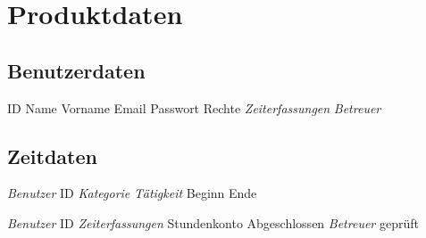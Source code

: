 \section{Produktdaten}

\subsection{Benutzerdaten}
\begin{requirements}
	\begin{requirements}
		 ID
		 Name
		 Vorname
		 Email
		 Passwort
		 Rechte
		 \emph{Zeiterfassungen}
		 \emph{Betreuer}
	\end{requirements}
\end{requirements}

\subsection{Zeitdaten}
\begin{requirements}
	\req [Zeiterfassung] {D20}
	\begin{requirements}
		 \emph{Benutzer} ID
		 \emph{Kategorie}
		 \emph{Tätigkeit}
		 Beginn
		 Ende
	\end{requirements}

	\req [Stundenzettel] {D30}
	\begin{requirements}
		 \emph{Benutzer} ID
		 \emph{Zeiterfassungen}
		 Stundenkonto
		 Abgeschlossen
		 \emph{Betreuer} geprüft
	\end{requirements}
\end{requirements}


